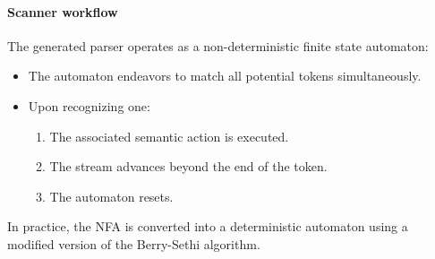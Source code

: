\paragraph*{Scanner workflow}
The generated parser operates as a non-deterministic finite state automaton:
\begin{itemize}
    \item The automaton endeavors to match all potential tokens simultaneously.
    \item Upon recognizing one:
        \begin{enumerate}
            \item The associated semantic action is executed.
            \item The stream advances beyond the end of the token.
            \item The automaton resets.
        \end{enumerate}
\end{itemize}
In practice, the NFA is converted into a deterministic automaton using a modified version of the Berry-Sethi algorithm.